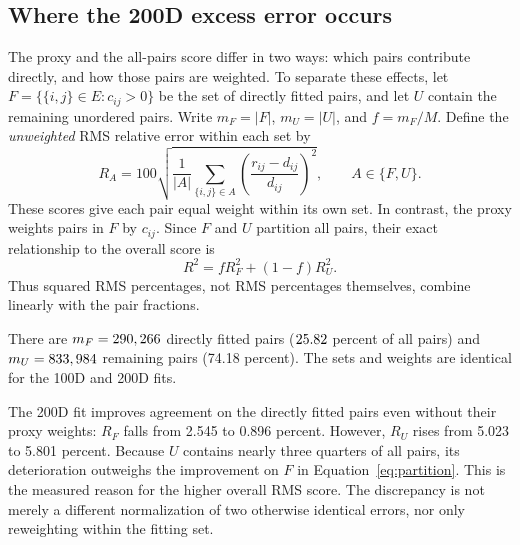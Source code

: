 \subsection{Where the 200D excess error occurs}
The proxy and the all-pairs score differ in two ways: which pairs contribute
directly, and how those pairs are weighted. To separate these effects,
let $F=\{\{i,j\}\in E:c_{ij}>0\}$ be the set of directly fitted pairs,
and let $U$ contain the remaining unordered pairs. Write $m_F=|F|$,
$m_U=|U|$, and $f=m_F/M$. Define the \emph{unweighted} RMS relative
error within each set by
\begin{equation}
R_A=100\sqrt{\frac{1}{|A|}\sum_{\{i,j\}\in A}
\left(\frac{r_{ij}-d_{ij}}{d_{ij}}\right)^2},\qquad A\in\{F,U\}.
\end{equation}
These scores give each pair equal weight within its own set. In contrast,
the proxy weights pairs in $F$ by $c_{ij}$. Since $F$ and $U$ partition
all pairs, their exact relationship to the overall score is
\begin{equation}\label{eq:partition}
R^2=fR_F^2+(1-f)R_U^2.
\end{equation}
Thus squared RMS percentages, not RMS percentages themselves, combine
linearly with the pair fractions.

There are $m_F=290,266$ directly fitted pairs
($25.82$ percent of all pairs) and
$m_U=833,984$ remaining pairs (74.18 percent).
The sets and weights are identical for the 100D and 200D fits.

\begin{table}[htbp]
\centering
\caption{A diagnostic decomposition of the saved final fits, with no
rerunning of optimization. All numeric scores are RMS percentages.
$R$ evaluates all pairs equally; $R_F$ evaluates directly fitted pairs
equally; $R_U$ evaluates pairs absent from the fitting list equally.
``Proxy'' uses the regional endpoint-average weights on $F$.
The table isolates pair selection from reweighting within $F$.}
\label{tab:partition}
\end{table}
\FloatBarrier

The 200D fit improves agreement on the directly fitted pairs even without
their proxy weights: $R_F$ falls from 2.545 to 0.896 percent.
However, $R_U$ rises from 5.023 to 5.801 percent. Because $U$ contains
nearly three quarters of all pairs, its deterioration outweighs the
improvement on $F$ in Equation~\eqref{eq:partition}. This is the measured
reason for the higher overall RMS score. The discrepancy is not merely
a different normalization of two otherwise identical errors, nor only
reweighting within the fitting set.

